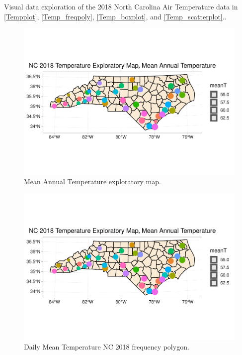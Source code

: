 \documentclass[12pt,]{article}
\begin{document}
Visual data exploration of the 2018 North Carolina Air Temperature data
in \autoref{Tempplot}, \autoref{Temp_freqpoly}, \autoref{Temp_boxplot},
and \autoref{Temp_scatterplot}..

\begin{figure}
\centering
\includegraphics{./Outputunnamed-chunk-28-1.pdf}
\caption{Mean Annual Temperature exploratory map. \label{Tempplot}}
\end{figure}

\begin{figure}
\centering
\includegraphics{./Outputunnamed-chunk-29-1.pdf}
\caption{Daily Mean Temperature NC 2018 frequency polygon.
\label{Temp_freqpoly}}
\end{figure}
\end{document}
